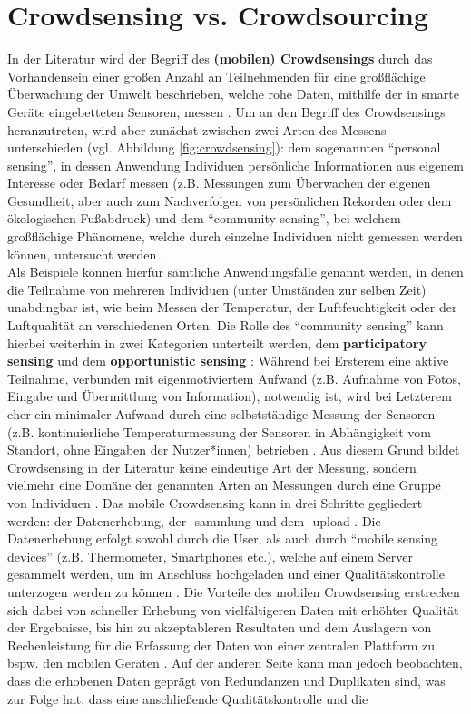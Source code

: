 \section{Crowdsensing vs. Crowdsourcing}
\label{sec:crowdsensing}
In der Literatur wird der Begriff des \textbf{(mobilen) Crowdsensings} durch das Vorhandensein einer großen Anzahl an Teilnehmenden für eine großflächige Überwachung der Umwelt beschrieben, welche rohe Daten, mithilfe der in smarte Geräte eingebetteten Sensoren, messen \cite{Ray2022}. Um an den Begriff des Crowdsensings heranzutreten, wird aber zunächst zwischen zwei Arten des Messens unterschieden (vgl. Abbildung \ref{fig:crowdsensing}): dem sogenannten \enquote{personal sensing}, in dessen Anwendung Individuen persönliche Informationen aus eigenem Interesse oder Bedarf messen (z.B. Messungen zum Überwachen der eigenen Gesundheit, aber auch zum Nachverfolgen von persönlichen Rekorden oder dem ökologischen Fußabdruck) und dem \enquote{community sensing}, bei welchem großflächige Phänomene, welche durch einzelne Individuen nicht gemessen werden können, untersucht werden \cite{Ganti2011}. \\ Als Beispiele können hierfür sämtliche Anwendungsfälle genannt werden, in denen die Teilnahme von mehreren Individuen (unter Umständen zur selben Zeit) unabdingbar ist, wie beim Messen der Temperatur, der Luftfeuchtigkeit oder der Luftqualität an verschiedenen Orten. Die Rolle des \enquote{community sensing} kann hierbei weiterhin in zwei Kategorien unterteilt werden, dem \textbf{participatory sensing} \cite{Burke2006} und dem \textbf{opportunistic sensing} \cite{Lane2010}: \newline Während bei Ersterem eine aktive Teilnahme, verbunden mit eigenmotiviertem Aufwand (z.B. Aufnahme von Fotos, Eingabe und Übermittlung von Information), notwendig ist, wird bei Letzterem eher ein minimaler Aufwand durch eine selbstständige Messung der Sensoren (z.B. kontinuierliche Temperaturmessung der Sensoren in Abhängigkeit vom Standort, ohne Eingaben der Nutzer*innen) betrieben \cite{Ganti2011}. Aus diesem Grund bildet Crowdsensing in der Literatur keine eindeutige Art der Messung, sondern vielmehr eine Domäne der genannten Arten an Messungen durch eine Gruppe von Individuen \cite{Ganti2011}. \newline Das mobile Crowdsensing kann in drei Schritte gegliedert werden: der Datenerhebung, der -sammlung und dem -upload \cite{Ray2022}. Die Datenerhebung erfolgt sowohl durch die User, als auch durch \enquote{mobile sensing devices} (z.B. Thermometer, Smartphones etc.), welche auf einem Server gesammelt werden, um im Anschluss hochgeladen und einer Qualitätskontrolle unterzogen werden zu können \cite{Ray2022}. Die Vorteile des mobilen Crowdsensing erstrecken sich dabei von schneller Erhebung von vielfältigeren Daten mit erhöhter Qualität der Ergebnisse, bis hin zu akzeptableren Resultaten und dem Auslagern von Rechenleistung für die Erfassung der Daten von einer zentralen Plattform zu bspw. den mobilen Geräten \cite{Ray2022}. Auf der anderen Seite kann man jedoch beobachten, dass die erhobenen Daten geprägt von Redundanzen und Duplikaten sind, was zur Folge hat, dass eine anschließende Qualitätskontrolle und die 